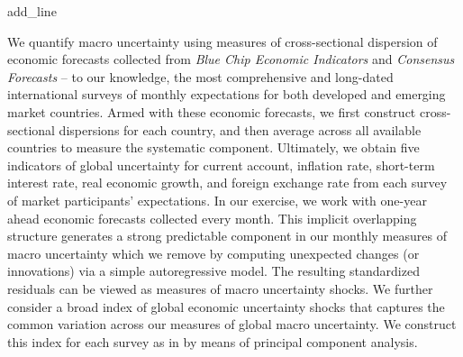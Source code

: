 add_line

We quantify macro uncertainty using measures of cross-sectional dispersion of economic forecasts collected from \emph{Blue Chip Economic Indicators} and \emph{Consensus Forecasts} -- to our knowledge, the most comprehensive and long-dated international surveys of monthly expectations for both developed and emerging market countries. Armed with these economic forecasts, we first construct cross-sectional dispersions for each country, and then average across all available countries to measure the systematic component. Ultimately, we obtain five indicators of global uncertainty for current account, inflation rate, short-term interest rate, real economic growth, and foreign exchange rate from each survey of market participants' expectations. In our exercise, we work with one-year ahead economic forecasts collected every month. This implicit overlapping structure generates a strong predictable component in our monthly measures of macro uncertainty which we remove by computing unexpected changes (or innovations) via a simple autoregressive model. The resulting standardized residuals can be viewed as measures of macro uncertainty shocks. We further consider a broad index of global economic uncertainty shocks that captures the common variation across our measures of global macro uncertainty. We construct this index for each survey as in \citet{Bali:2014} by means of principal component analysis.

